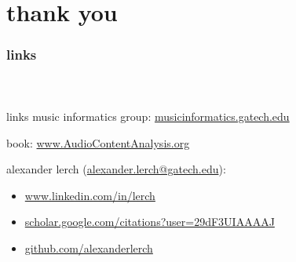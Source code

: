     \section[links]{thank you}

      \begin{frame}\frametitle{links}\framesubtitle{~}
            \begin{block}{links}
                music informatics group:
                \href{http://musicinformatics.gatech.edu}{musicinformatics.gatech.edu}
                
                \bigskip                
                book: \href{https://www.AudioContentAnalysis.org}{www.AudioContentAnalysis.org}

                \bigskip
                alexander lerch (\href{mailto:alexander.lerch@gatech.edu}{alexander.lerch@gatech.edu}): 
                    \begin{itemize}
                        \item \href{https://www.linkedin.com/in/lerch}{www.linkedin.com/in/lerch}
                        \item \href{https://scholar.google.com/citations?user=29dF3UIAAAAJ}{scholar.google.com/citations?user=29dF3UIAAAAJ}
                        \item \href{https://github.com/alexanderlerch}{github.com/alexanderlerch}
                    \end{itemize}             
                


								
								\vspace{5mm}

            \end{block}
            
        \end{frame}
